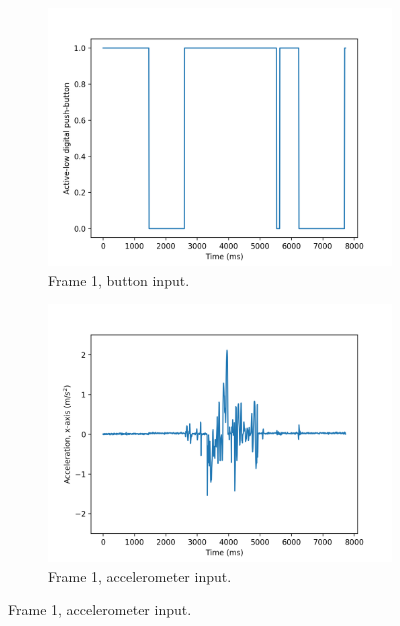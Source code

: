 \documentclass[12pt]{article}
\begin{document}
\begin{figure}[ht]
\centering

\begin{subfigure}[b]{.45\linewidth}
\includegraphics[width=\linewidth]{f0-button.png}
\caption{Frame 1, button input.}
\end{subfigure}
\begin{subfigure}[b]{.45\linewidth}
\includegraphics[width=\linewidth]{f0-acc.png}
\caption{Frame 1, accelerometer input.}
\end{subfigure}


\end{figure}
\end{document}
